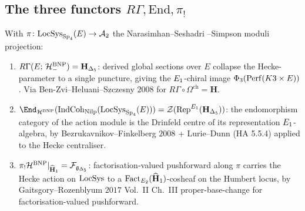 \subsection{The three functors $R\Gamma, \mathrm{End}, \pi_!$}
\label{subsec:wave9-o3-three-functors}

\begin{conjecture}
\label{thm:wave9-o3-three-functors}
With
$\pi \colon \mathrm{LocSys}_{\mathrm{Sp}_4}(E) \to \mathcal{A}_2$ the Narasimhan--Seshadri
--Simpson moduli projection:
\begin{enumerate}
\item[($T_1$)] $R\Gamma(E;\,\mathcal{H}^{\mathrm{BNP}}_{-}) = \mathbf H_{\Delta_5}$:
derived global sections over $E$ collapse the Hecke-parameter to
a single puncture, giving the $E_1$-chiral image
$\Phi_3(\mathrm{Perf}(K3 \times E))$. Via Ben-Zvi--Heluani--Szczesny
$2008$ for $R\Gamma \circ \Omega^{\mathrm{ch}} = \mathbf H$.
\item[($T_2$)] $\End_{\Hec^{\BNP}}(\IndCoh_{\Nilp}
(\LocSys_{\Sp_4}(E))) = \cZ(\Rep^{\Eone}(\mathbf H_{\Delta_5}))$:
the endomorphism category of the action module is the Drinfeld
centre of its representation $E_1$-algebra, by
Bezrukavnikov--Finkelberg $2008$ + Lurie--Dunn (HA 5.5.4)
applied to the Hecke centraliser.
\item[($T_3$)] $\pi_! \mathcal{H}^{\mathrm{BNP}}|_{\widehat{\mathbf H}_1} =
\mathcal{F}_{\mathfrak{g}_{\Delta_5}}$: factorisation-valued pushforward along $\pi$
carries the Hecke action on $\mathrm{LocSys}$ to a
$\mathrm{Fact}_{E_2}(\widehat{\mathbf H}_1)$-cosheaf on the Humbert
locus, by Gaitsgory--Rozenblyum $2017$ Vol.~II Ch.~III
proper-base-change for factorisation-valued pushforward.
\end{enumerate}
\end{conjecture}

